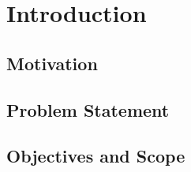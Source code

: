 \chapter{Introduction}

\section{Motivation}

\section{Problem Statement}

\section{Objectives and Scope}